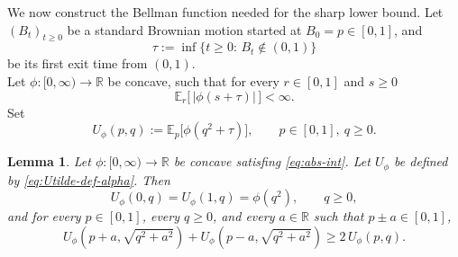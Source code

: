 \documentclass[11pt]{amsart}
\newtheorem{lemma}[theorem]{Lemma}
\theoremstyle{definition}
\renewcommand{\1}{{\mathbbm{1}}}
\begin{document}


We now construct the Bellman function needed for the sharp lower bound.
Let $(B_t)_{t\ge0}$ be a standard Brownian motion started at $B_0=p\in[0,1]$, and
\[
\tau:=\inf\{t\ge0:\, B_t\notin(0,1)\}
\]
be its first exit time from $(0,1)$. \\

Let $\phi:[0,\infty)\to\mathbb R$ be concave, such that for every $r\in[0,1]$ and $s\ge 0$
\begin{equation}
\label{eq:abs-int}
    \mathbb E_r\!\bigl[\,|\phi(s+\tau)|\,\bigr]<\infty.
\end{equation}
Set
\begin{equation}\label{eq:Utilde-def-alpha}
U_\phi(p,q):=\mathbb E_p\!\big[\phi(q^2+\tau)\big], \qquad p\in[0,1],\ q\ge 0.
\end{equation}



\begin{lemma}\label{lem:one-step-concavity}
Let $\phi:[0,\infty)\to\mathbb R$ be concave satisfing \eqref{eq:abs-int}.
Let $U_\phi$ be defined by \eqref{eq:Utilde-def-alpha}. Then
\[
U_\phi(0,q)=U_\phi(1,q)=\phi(q^2), \qquad q\ge 0,
\]
and for every $p\in[0,1]$, every $q\ge 0$, and every $a\in\mathbb R$ such that
$p\pm a\in[0,1]$,
\[
U_\phi\!\left(p+a,\sqrt{q^2+a^2}\right)
+
U_\phi\!\left(p-a,\sqrt{q^2+a^2}\right)
\ge 2\,U_\phi(p,q).
\]
\end{lemma}
\end{document}
